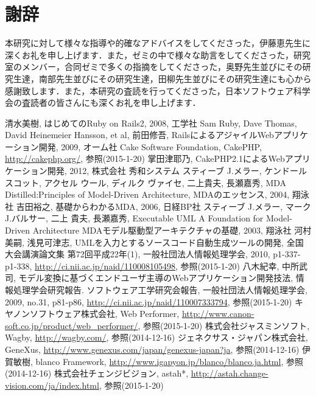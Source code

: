 \documentclass{funthesis}
\begin{document}
\chapter*{謝辞}
本研究に対して様々な指導や的確なアドバイスをしてくださった，伊藤恵先生に深くお礼を申し上げます．また，ゼミの中で様々な助言をしてくださった，研究室のメンバー，合同ゼミで多くの指摘をしてくださった，奥野先生並びにその研究生達，南部先生並びにその研究生達，田柳先生並びにその研究生達にも心から感謝致します．また，本研究の査読を行ってくださった，日本ソフトウェア科学会の査読者の皆さんにも深くお礼を申し上げます．

\begin{thebibliography}{99}
 清水美樹, はじめてのRuby on Rails2, 2008, 工学社
 Sam Ruby, Dave Thomas, David Heinemeier Hansson, et al, 前田修吾, RailsによるアジャイルWebアプリケーション開発, 2009, オーム社
 Cake Software Foundation, CakePHP, {\url{http://cakephp.org/}}, 参照(2015-1-20)
 掌田津耶乃, CakePHP2.1によるWebアプリケーション開発, 2012, 株式会社 秀和システム
 スティーブ J.メラー, ケンドール スコット, アクセル ウール, ディルク ヴァイセ,  二上貴夫, 長瀬嘉秀, MDA Distilled:Principles of Model-Driven Architecture, MDAのエッセンス, 2004, 翔泳社
 吉田裕之, 基礎からわかるMDA, 2006, 日経BP社
 スティーブ J.メラー, マーク J.バルサー,  二上 貴夫, 長瀬嘉秀, Executable UML A Foundation for Model-Driven Architecture MDAモデル駆動型アーキテクチャの基礎, 2003, 翔泳社
 河村美嗣, 浅見可津志, UMLを入力とするソースコード自動生成ツールの開発, 全国大会講演論文集 第72回平成22年(1), 一般社団法人情報処理学会, 2010, p1-337-p1-338, {\url{http://ci.nii.ac.jp/naid/110008105498}}, 参照(2015-1-20)
 八木紀幸, 中所武司, モデル変換に基づくエンドユーザ主導のWebアプリケーション開発技法, 情報処理学会研究報告. ソフトウェア工学研究会報告, 一般社団法人情報処理学会, 2009, no.31, p81-p86, {\url{http://ci.nii.ac.jp/naid/110007333794}}, 参照(2015-1-20)
 キヤノンソフトウェア株式会社, Web Performer, {\url{http://www.canon-soft.co.jp/product/web_performer/}}, 参照(2015-1-20)
 株式会社ジャスミンソフト, Wagby, {\url{http://wagby.com/}}, 参照(2014-12-16)
 ジェネクサス・ジャパン株式会社, GeneXus, {\url{http://www.genexus.com/japan/genexus-japan?ja}}, 参照(2014-12-16)
 伊賀敏樹, blanco Framework, {\url{http://www.igapyon.jp/blanco/blanco.ja.html}}, 参照(2014-12-16)
 株式会社チェンジビジョン, astah*,  {\url{http://astah.change-vision.com/ja/index.html}}, 参照(2015-1-20)

\end{thebibliography}
\end{document}
